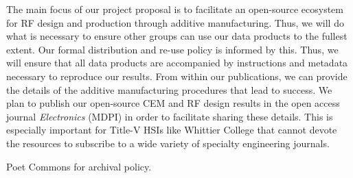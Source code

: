 \documentclass[../../main.tex]{subfiles}
\begin{document}
The main focus of our project proposal is to facilitate an open-source ecosystem for RF design and production through additive manufacturing.  Thus, we will do what is necessary to ensure other groups can use our data products to the fullest extent.  Our formal distribution and re-use policy is informed by this.  Thus, we will ensure that all data products are accompanied by instructions and metadata necessary to reproduce our results.  From within our publications, we can provide the details of the additive manufacturing procedures that lead to success.  We plan to publish our open-source CEM and RF design results in the open access journal \textit{Electronics} (MDPI) in order to facilitate sharing these details.  This is especially important for Title-V HSIs like Whittier College that cannot devote the resources to subscribe to a wide variety of specialty engineering journals.  \\ \vspace{2.5mm}

Poet Commons for archival policy.  \\ \vspace{2.5mm}
\end{document}
